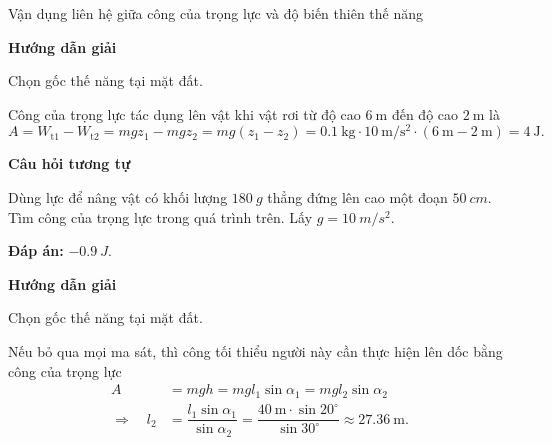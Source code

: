 \begin{dang}{Vận dụng liên hệ giữa công của trọng lực  và độ biến thiên thế năng }
	
	{\begin{center}
			\textbf{Hướng dẫn giải}
		\end{center}
		
		Chọn gốc thế năng tại mặt đất.
		
		Công của trọng lực tác dụng lên vật khi vật rơi từ độ cao $\SI{6}{\meter}$ đến độ cao $\SI{2}{\meter}$ là
		\begin{equation*}
			A=W_{\text{t}1}-W_{\text{t}2}=mgz_1-mgz_2=mg(z_1-z_2)=\SI{0,1}{\kilogram}\cdot\SI{10}{\meter/\second^2}\cdot(\SI{6}{\meter}-\SI{2}{\meter})=\SI{4}{\joule}.
		\end{equation*}
		
		\begin{center}
			\textbf{Câu hỏi tương tự}
		\end{center}
		
		Dùng lực để nâng vật có khối lượng $\SI{180}{g}$ thẳng đứng lên cao một đoạn $\SI{50}{cm}$. Tìm công của trọng lực trong quá trình trên. Lấy $g=\SI{10}{m/s^2}$.
		
		\textbf{Đáp án:} $\SI{-0.9}{J}$.
	}
	{\begin{center}
			\textbf{Hướng dẫn giải}
		\end{center}
		
		Chọn gốc thế năng tại mặt đất.
		
		Nếu bỏ qua mọi ma sát, thì công tối thiểu người này cần thực hiện lên dốc bằng công của trọng lực
		\begin{align*}
			A&=mgh=mgl_1\sin\alpha_1=mgl_2\sin\alpha_2\\
			\Rightarrow\quad l_2&=\dfrac{l_1\sin\alpha_1}{\sin\alpha_2}=\dfrac{\SI{40}{\meter}\cdot\sin 20^\circ}{\sin 30^\circ}\approx\SI{27,36}{\meter}.
		\end{align*}
	}
\end{dang}